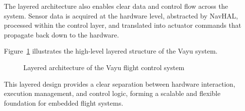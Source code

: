 The layered architecture also enables clear data and control flow across the system. Sensor data is acquired at the hardware level, abstracted by NavHAL, processed within the control layer, and translated into actuator commands that propagate back down to the hardware.

Figure~\ref{fig:layered_arch} illustrates the high-level layered structure of the Vayu system.

\begin{figure}[H]
    \centering
    \caption{Layered architecture of the Vayu flight control system}
    \label{fig:layered_arch}
\end{figure}

This layered design provides a clear separation between hardware interaction, execution management, and control logic, forming a scalable and flexible foundation for embedded flight systems.